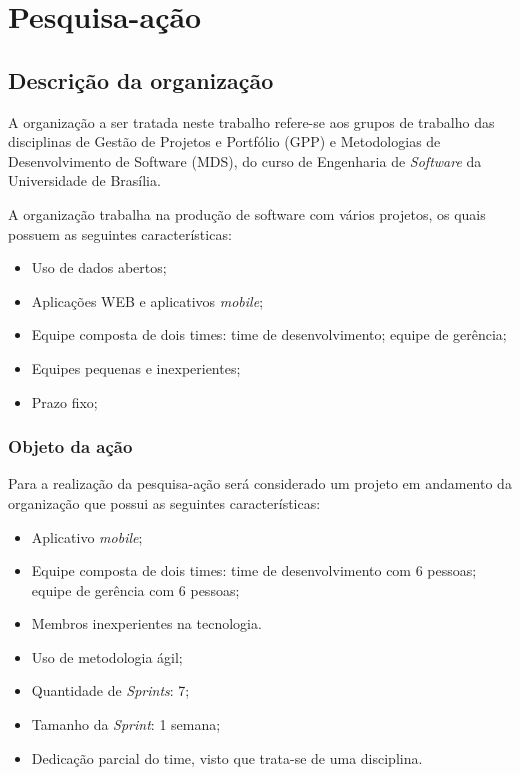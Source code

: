 \chapter{Pesquisa-ação}
\label{pesquisa_acao}
	\section{Descrição da organização}

		A organização a ser tratada neste trabalho refere-se aos grupos de trabalho das disciplinas de Gestão de Projetos
		e Portfólio (GPP) e Metodologias de Desenvolvimento de Software (MDS), do curso de Engenharia de \textit{Software}
		da Universidade de Brasília.

		A organização trabalha na produção de software com vários projetos, os quais possuem as seguintes características:

		\begin{itemize}
			\item Uso de dados abertos;
			\item Aplicações WEB e aplicativos \textit{mobile};
			\item Equipe composta de dois times:
				 time de desenvolvimento;
				 equipe de gerência;
			\item Equipes pequenas e inexperientes;
			\item Prazo fixo;
		\end{itemize}

		\subsection{Objeto da ação}

		Para a realização da pesquisa-ação será considerado um projeto em andamento da organização que possui as seguintes características:


		\begin{itemize}
			\item Aplicativo \textit{mobile};
			\item Equipe composta de dois times:
				 time de desenvolvimento com 6 pessoas;
				 equipe de gerência com 6 pessoas;
			\item Membros inexperientes na tecnologia.
			\item Uso de metodologia ágil;
			\item Quantidade de \textit{Sprints}: 7;
			\item Tamanho da \textit{Sprint}: 1 semana;
			\item Dedicação parcial do time, visto que trata-se de uma disciplina.
		\end{itemize}

